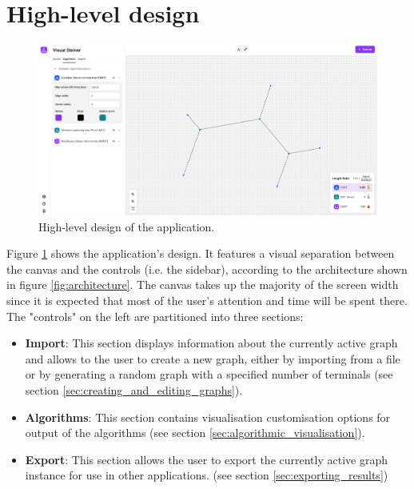 \documentclass{l4proj}
\begin{document}
\section{High-level design}
\label{sec:high_level_design}
\begin{figure}[h]
    \centering
    \begin{tcolorbox}[colframe=gray!20, colback=gray!5, boxrule=1pt, arc=0mm, boxsep=0pt, left=0pt, right=0pt, top=0pt, bottom=0pt]
        \includegraphics[width=\textwidth]{images/app_overview.png}
    \end{tcolorbox}

    \caption{High-level design of the application.}
    \label{fig:high_level_design}
\end{figure}
Figure \ref{fig:high_level_design} shows the application's design. It features a visual separation between the canvas and the controls (i.e. the sidebar), according to the architecture shown in figure \ref{fig:architecture}.
The canvas takes up the majority of the screen width since it is expected that most of the user's attention and time will be spent there. The "controls" on the left are partitioned into three sections:
\begin{itemize}
    \item \textbf{Import}: This section displays information about the currently active graph and allows to the user to create a new graph, either by importing from a file or by generating a random graph with a specified number of terminals (see section \ref{sec:creating_and_editing_graphs}).
    \item \textbf{Algorithms}: This section contains visualisation customisation options for output of the algorithms (see section \ref{sec:algorithmic_visualisation}).
    \item \textbf{Export}: This section allows the user to export the currently active graph instance for use in other applications. (see section \ref{sec:exporting_results})
\end{itemize}
\end{document}
